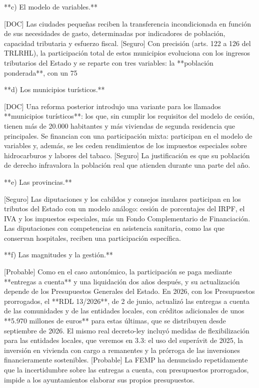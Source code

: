 \documentclass[10pt,a4paper]{article}
\begin{document}
**c) El modelo de variables.**

[DOC] Las ciudades pequeñas reciben la transferencia incondicionada en función de sus necesidades de gasto, determinadas por indicadores de población, capacidad tributaria y esfuerzo fiscal. [Seguro] Con precisión (arts. 122 a 126 del TRLRHL), la participación total de estos municipios evoluciona con los ingresos tributarios del Estado y se reparte con tres variables: la **población ponderada**, con un 75%

**d) Los municipios turísticos.**

[DOC] Una reforma posterior introdujo una variante para los llamados **municipios turísticos**: los que, sin cumplir los requisitos del modelo de cesión, tienen más de 20.000 habitantes y más viviendas de segunda residencia que principales. Se financian con una participación mixta: participan en el modelo de variables y, además, se les ceden rendimientos de los impuestos especiales sobre hidrocarburos y labores del tabaco. [Seguro] La justificación es que su población de derecho infravalora la población real que atienden durante una parte del año.

**e) Las provincias.**

[Seguro] Las diputaciones y los cabildos y consejos insulares participan en los tributos del Estado con un modelo análogo: cesión de porcentajes del IRPF, el IVA y los impuestos especiales, más un Fondo Complementario de Financiación. Las diputaciones con competencias en asistencia sanitaria, como las que conservan hospitales, reciben una participación específica.

**f) Las magnitudes y la gestión.**

[Probable] Como en el caso autonómico, la participación se paga mediante **entregas a cuenta** y una liquidación dos años después, y su actualización depende de los Presupuestos Generales del Estado. En 2026, con los Presupuestos prorrogados, el **RDL 13/2026**, de 2 de junio, actualizó las entregas a cuenta de las comunidades y de las entidades locales, con créditos adicionales de unos **5.970 millones de euros** para estas últimas, que se distribuyen desde septiembre de 2026. El mismo real decreto-ley incluyó medidas de flexibilización para las entidades locales, que veremos en 3.3: el uso del superávit de 2025, la inversión en vivienda con cargo a remanentes y la prórroga de las inversiones financieramente sostenibles. [Probable] La FEMP ha denunciado repetidamente que la incertidumbre sobre las entregas a cuenta, con presupuestos prorrogados, impide a los ayuntamientos elaborar sus propios presupuestos.
\end{document}
